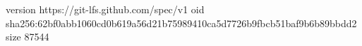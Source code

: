 version https://git-lfs.github.com/spec/v1
oid sha256:62bf0abb1060cd0b619a56d21b75989410ca5d7726b9fbcb51baf9b6b89bbdd2
size 87544
